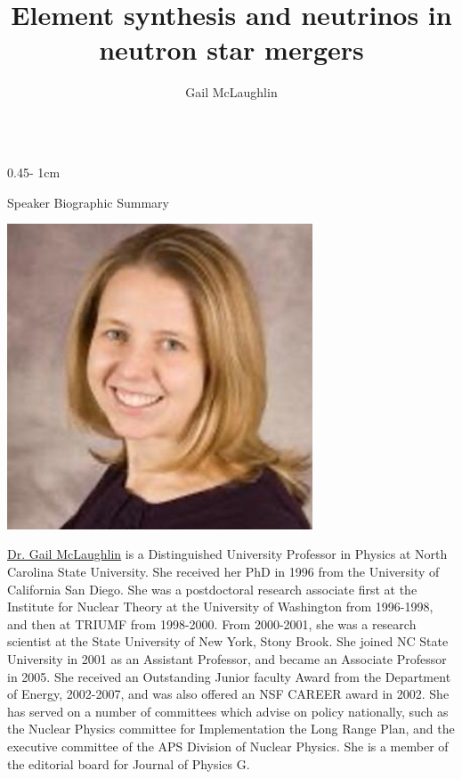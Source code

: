 \documentclass{../psuposter}
\title{Element synthesis and neutrinos in neutron star mergers}
\author{Gail McLaughlin}
\institute{North Carolina State University}
\begin{document}
\begin{frame}
\begin{columns}[t, totalwidth=\textwidth]
\begin{column}{0.45\textwidth - 1cm}


    \begin{block}{Speaker Biographic Summary}
    	\begin{center}
    		\includegraphics[width=0.68\textwidth]{images/portrait}
    	\end{center}
    	\href{https://physics.sciences.ncsu.edu/people/gcmclaug/}{Dr. Gail McLaughlin} is a Distinguished University Professor in Physics at North Carolina State University. She received her PhD in 1996 from the University of California San Diego. She was a postdoctoral research associate first at the Institute for Nuclear Theory at the University of Washington from 1996-1998, and then at TRIUMF from 1998-2000. From 2000-2001, she was a research scientist at the State University of New York, Stony Brook. She joined NC State University in 2001 as an Assistant Professor, and became an Associate Professor in 2005. She received an Outstanding Junior faculty Award from the Department of Energy, 2002-2007, and was also offered an NSF CAREER award in 2002. She has served on a number of committees which advise on policy nationally, such as the Nuclear Physics committee for Implementation the Long Range Plan, and the executive committee of the APS Division of Nuclear Physics. She is a member of the editorial board for Journal of Physics G.
    \end{block}



\end{column}
\end{columns}
\end{frame}
\end{document}
